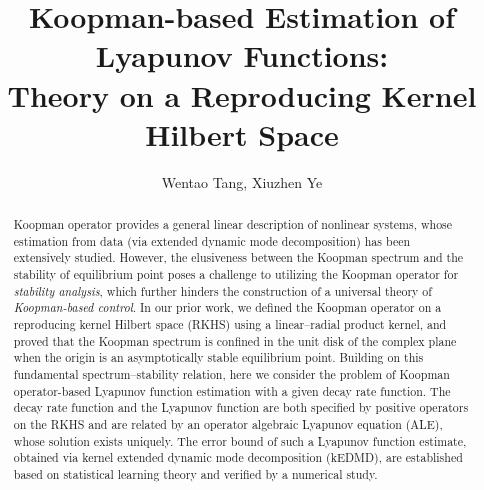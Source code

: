 \documentclass[english]{cccconf}
\renewcommand{\emph}[1]{\textit{#1}}
\begin{document}
\title{Koopman-based Estimation of Lyapunov Functions: \\ Theory on a Reproducing Kernel Hilbert Space}
\author{Wentao Tang, Xiuzhen Ye}
\maketitle

\begin{abstract}
    Koopman operator provides a general linear description of nonlinear systems, whose estimation from data (via extended dynamic mode decomposition) has been extensively studied. 
    However, the elusiveness between the Koopman spectrum and the stability of equilibrium point poses a challenge to utilizing the Koopman operator for \emph{stability analysis}, which further hinders the construction of a universal theory of \emph{Koopman-based control}. 
    In our prior work, we defined the Koopman operator on a reproducing kernel Hilbert space (RKHS) using a linear--radial product kernel, and proved that the Koopman spectrum is confined in the unit disk of the complex plane when the origin is an asymptotically stable equilibrium point. 
    Building on this fundamental spectrum--stability relation, here we consider the problem of Koopman operator-based Lyapunov function estimation with a given decay rate function. The decay rate function and the Lyapunov function are both specified by positive operators on the RKHS and are related by an operator algebraic Lyapunov equation (ALE), whose solution exists uniquely. 
    The error bound of such a Lyapunov function estimate, obtained via kernel extended dynamic mode decomposition (kEDMD), are established based on statistical learning theory and verified by a numerical study. 
\end{abstract}
\footnotemark{} 
\end{document}
